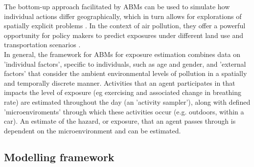 \documentclass{article}
\begin{document}
\noindent The bottom-up approach facilitated by ABMs can be used to simulate how individual actions differ geographically, which in turn allows for explorations of spatially explicit problems \cite{Crooks2012IntroductionModelling}. In the context of air pollution, they offer a powerful opportunity for policy makers to predict exposures under different land use and transportation scenarios \cite{Gurram2019Agent-basedData}.\\

\noindent In general, the framework for ABMs for exposure estimation combines data on 'individual factors', specific to individuals, such as age and gender, and 'external factors' that consider the ambient environmental levels of pollution in a spatially and temporally discrete manner. Activities that an agent participates in that impacts the level of exposure (eg exercising and associated change in breathing rate) are estimated throughout the day (an 'activity sampler'), along with defined 'microenviroments' through which these activities occur (e.g. outdoors, within a car)\cite{zidek2005using}. An estimate of the hazard, or exposure, that an agent passes through is dependent on the microenvironment and can  be estimated. 

\clearpage	
\subsection{Modelling framework}

\end{document}
